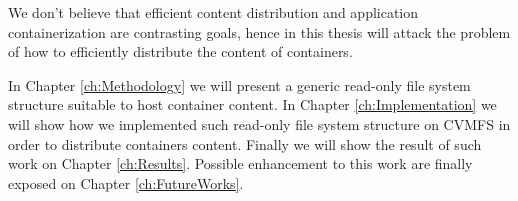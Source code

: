 We don't believe that efficient content distribution and application
containerization are contrasting goals, hence in this thesis will attack the
problem of how to efficiently distribute the content of containers.

In Chapter \ref{ch:Methodology} we will present a generic read-only file system
structure suitable to host container content.  In Chapter
\ref{ch:Implementation} we will show how we implemented such read-only file
system structure on CVMFS in order to distribute containers content. Finally we
will show the result of such work on Chapter \ref{ch:Results}. Possible
enhancement to this work are finally exposed on Chapter \ref{ch:FutureWorks}.

